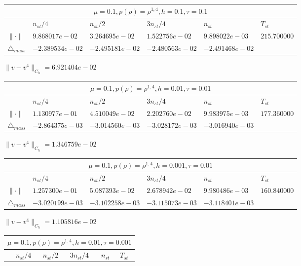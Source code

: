 \documentclass[12pt,a4paper]{article}
\begin{document}
\begin{tabular}{*{6}{|l}|}
    \hline
     \\
    \hline
    &$n_{st}/4 $&$ n_{st}/2$&$3n_{st}/4$&$n_{st}$&$T_{st}$ \\
    \hline
    $\|\cdot \|$& $9.868017e-02$ & $3.264695e-02$ & $1.522756e-02$ & $9.898022e-03$ &$215.700000$\\
\hline
$\triangle_{mass}$& $-2.389534e-02$ & $-2.495181e-02$ & $-2.480563e-02$ & $-2.491468e-02$ &\\
\hline
\end{tabular}

$\|v-v^{4}\|_{C_h} = 6.921404e-02$


\begin{tabular}{*{6}{|l}|}
    \hline
     \\
    \hline
    &$n_{st}/4 $&$ n_{st}/2$&$3n_{st}/4$&$n_{st}$&$T_{st}$ \\
    \hline
$\|\cdot \|$& $1.130977e-01$ & $4.510049e-02$ & $2.202760e-02$ & $9.983975e-03$ &$177.360000$\\
\hline
$\triangle_{mass}$& $-2.864375e-03$ & $-3.014560e-03$ & $-3.028172e-03$ & $-3.016940e-03$ &\\
\hline
\end{tabular}

$\|v-v^{4}\|_{C_h} = 1.346759e-02$


\begin{tabular}{*{6}{|l}|}
    \hline
     \\
    \hline
    &$n_{st}/4 $&$ n_{st}/2$&$3n_{st}/4$&$n_{st}$&$T_{st}$ \\
    \hline
    $\|\cdot \|$& $1.257300e-01$ & $5.087393e-02$ & $2.678942e-02$ & $9.980486e-03$ &$160.840000$\\
\hline
$\triangle_{mass}$& $-3.020199e-03$ & $-3.102258e-03$ & $-3.115073e-03$ & $-3.118401e-03$ &\\
\hline
\end{tabular}

$\|v-v^{4}\|_{C_h} = 1.105816e-02$

\begin{tabular}{*{6}{|l}|}
    \hline
     \\
    \hline
    &$n_{st}/4 $&$ n_{st}/2$&$3n_{st}/4$&$n_{st}$&$T_{st}$ \\
    \hline
\end{tabular}
\end{document}
